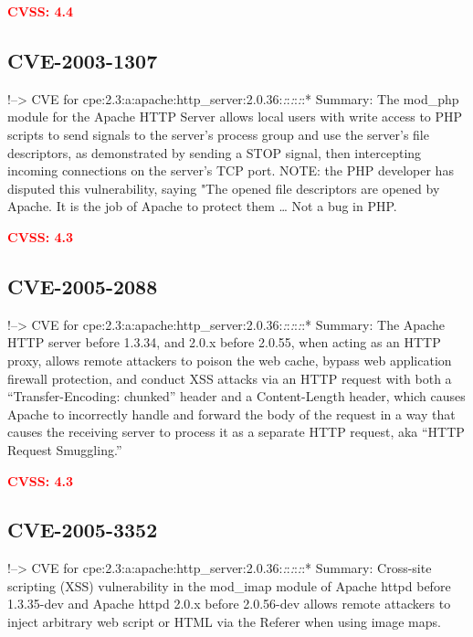 \documentclass[a4paper, 12pt]{article}
\begin{document}
\textbf{\textcolor{red}{CVSS: 4.4}}

\hypertarget{cve-2003-1307}{%
\subsection{CVE-2003-1307}\label{cve-2003-1307}}

!--\textgreater{} CVE for
cpe:2.3:a:apache:http\_server:2.0.36:\emph{:}:\emph{:}:\emph{:}:*
Summary: The mod\_php module for the Apache HTTP Server allows local
users with write access to PHP scripts to send signals to the server's
process group and use the server's file descriptors, as demonstrated by
sending a STOP signal, then intercepting incoming connections on the
server's TCP port. NOTE: the PHP developer has disputed this
vulnerability, saying "The opened file descriptors are opened by Apache.
It is the job of Apache to protect them \ldots{} Not a bug in PHP.

\textbf{\textcolor{red}{CVSS: 4.3}}

\hypertarget{cve-2005-2088}{%
\subsection{CVE-2005-2088}\label{cve-2005-2088}}

!--\textgreater{} CVE for
cpe:2.3:a:apache:http\_server:2.0.36:\emph{:}:\emph{:}:\emph{:}:*
Summary: The Apache HTTP server before 1.3.34, and 2.0.x before 2.0.55,
when acting as an HTTP proxy, allows remote attackers to poison the web
cache, bypass web application firewall protection, and conduct XSS
attacks via an HTTP request with both a ``Transfer-Encoding: chunked''
header and a Content-Length header, which causes Apache to incorrectly
handle and forward the body of the request in a way that causes the
receiving server to process it as a separate HTTP request, aka ``HTTP
Request Smuggling.''

\textbf{\textcolor{red}{CVSS: 4.3}}

\hypertarget{cve-2005-3352}{%
\subsection{CVE-2005-3352}\label{cve-2005-3352}}

!--\textgreater{} CVE for
cpe:2.3:a:apache:http\_server:2.0.36:\emph{:}:\emph{:}:\emph{:}:*
Summary: Cross-site scripting (XSS) vulnerability in the mod\_imap
module of Apache httpd before 1.3.35-dev and Apache httpd 2.0.x before
2.0.56-dev allows remote attackers to inject arbitrary web script or
HTML via the Referer when using image maps.
\end{document}
